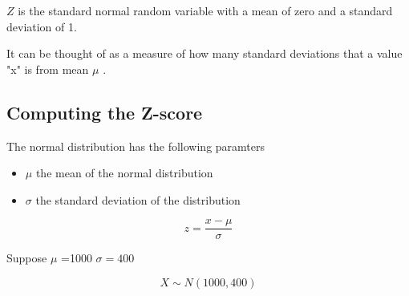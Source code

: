 \documentclass[]{report}
\begin{document}
$Z$ is the standard normal random variable with a mean of zero and a standard deviation of 1.



It can be thought of as a measure of how many standard deviations that a value "x" is from mean $\mu$ .





\subsection{Computing the Z-score}
The normal distribution has the following paramters

\begin{itemize}
\item $\mu$ the mean of the normal distribution
\item $\sigma$ the standard deviation of the distribution
\end{itemize}


\[z = \frac{x - \mu}{ \sigma}\]

Suppose $ \mu$ =1000
$\sigma=400$

\[ X \sim N(1000,400) \]
\end{document}
